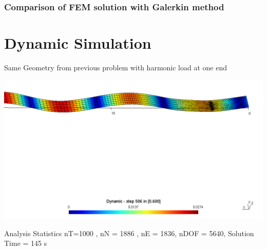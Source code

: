 \documentclass[9pt]{beamer}
\begin{document}
\begin{frame}
\frametitle{Comparison of FEM solution with Galerkin method }
\begin{figure}[h!]
\centering

\end{figure}

\end{frame}





\section{Dynamic Simulation}



\begin{frame}
Same Geometry from previous problem with harmonic load at one end

\begin{figure}[h!]
\centering

\end{figure}
\href{run:movie1.mpg}{\includegraphics[width=1.0\textwidth,trim={0cm 15cm 0cm 1cm},clip]{ParaStudy_onlydata/dir.png}}



\begin{block}{Analysis Statistics}
nT=1000 , nN = 1886 , nE = 1836, nDOF = 5640, Solution Time = 145 s

\end{block}

\end{frame}
\end{document}
